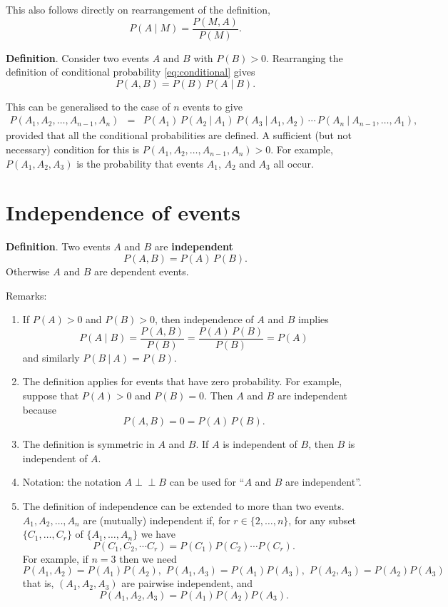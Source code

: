 \documentclass[
  british,
]{book}
\providecommand{\tightlist}{%
  \setlength{\itemsep}{0pt}\setlength{\parskip}{0pt}}
\begin{document}
This also follows directly on rearrangement of the definition,
\[ P(A \mid M) = \frac{P(M , A)}{P(M)}. \]

\textbf{Definition}. Consider two events \(A\) and \(B\) with \(P(B)>0\). Rearranging the definition of conditional probability \eqref{eq:conditional} gives
\begin{equation}
P(A , B) = P(B)\,P(A \mid B).  
\label{eq:mult}
\end{equation}

This can be generalised to the case of \(n\) events to give
\begin{eqnarray}
P(A_1, A_2,\ldots, A_{n-1}, A_n) &=&
P(A_1)\,P(A_2~|~A_1)\,P(A_3~|~A_1,A_2)\,\cdots\,P(A_n~|~A_{n-1},\ldots,A_1),
\end{eqnarray}
provided that all the conditional probabilities are defined. A sufficient (but not necessary) condition for this is \(P(A_1, A_2, \ldots, A_{n-1}, A_n)>0\). For example, \(P(A_1, A_2, A_3)\) is the probability that events \(A_1\), \(A_2\) and \(A_3\) all occur.

\hypertarget{indepevents}{%
\section{Independence of events}\label{indepevents}}

\textbf{Definition}. Two events \(A\) and \(B\) are \textbf{independent}
\begin{equation}
P(A , B) = P(A) \,P(B).  
\label{eq:indep}
\end{equation}
Otherwise \(A\) and \(B\) are dependent events.

Remarks:

\begin{enumerate}
\def\labelenumi{\arabic{enumi}.}
\tightlist
\item
  If \(P(A) > 0\) and \(P(B) > 0\), then independence of \(A\) and \(B\) implies
  \[ P(A \mid B) = \frac{P(A , B)}{P(B)} = \frac{P(A)\,P(B)}{P(B)} = P(A) \]
  and similarly \(P(B~|~A)=P(B)\).
\item
  The definition applies for events that have zero probability. For example, suppose that \(P(A)>0\) and \(P(B)=0\). Then \(A\) and \(B\) are independent because
  \[ P(A , B) = 0 = P(A)\,P(B). \]
\item
  The definition is symmetric in \(A\) and \(B\). If \(A\) is independent of \(B\), then \(B\) is independent of \(A\).
\item
  Notation: the notation \(A \perp \!\!\! \perp B\) can be used for ``\(A\) and \(B\) are independent''.
\item
  The definition of independence can be extended to more than two events.
  \(A_1, A_2, \ldots, A_n\) are (mutually) independent if, for \(r \in \{2, \ldots, n\}\), for any subset \(\{ C_1, \ldots, C_r \}\) of \(\{ A_1, \ldots, A_n\}\) we have
  \[ P(C_{1} , C_{2} , \cdots C_{r}) = P(C_{1}) P(C_{2}) \cdots P(C_{r}). \]
  For example, if \(n = 3\) then we need
  \[ P(A_{1} , A_{2}) = P(A_1) P(A_2), \,\, P(A_{1} , A_{3}) = P(A_1) P(A_3), \,\, P(A_{2} , A_{3}) = P(A_2) P(A_3) \]
  that is, \((A_1, A_2, A_3)\) are pairwise independent, and
  \[ P(A_{1} , A_{2} , A_{3}) = P(A_{1}) P(A_{2}) P(A_{3}). \]
\end{enumerate}
\end{document}
